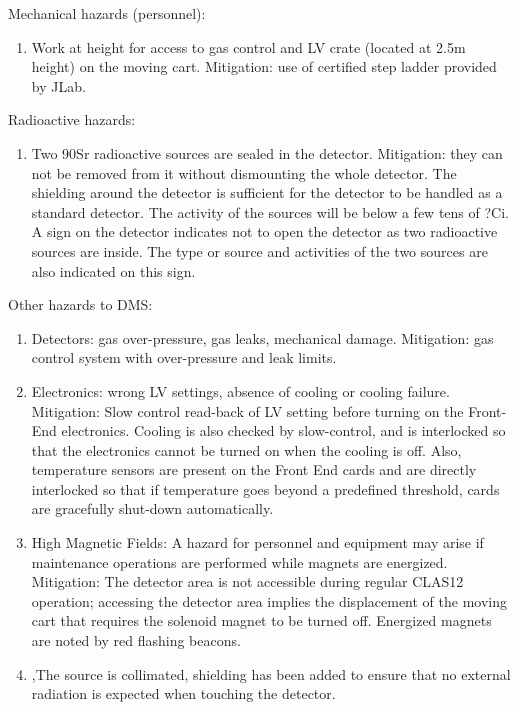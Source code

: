 Mechanical hazards (personnel):
\begin{enumerate}
\item	Work at height for access to gas control and LV crate (located at 2.5m height) on the moving cart. Mitigation: use of certified step ladder provided by JLab.
\end{enumerate}


Radioactive hazards:
\begin{enumerate}
\item Two 90Sr radioactive sources are sealed in the detector. Mitigation: they can not be removed from it without dismounting the whole detector. The shielding around the detector is sufficient for the detector to be handled as a standard detector. The activity of the sources will be below a few tens of ?Ci. A sign on the detector indicates not to open the detector as two radioactive sources are inside. The type or source and activities of the two sources are also indicated on this sign.
\end{enumerate}


Other hazards to DMS:
\begin{enumerate}
\item Detectors: gas over-pressure, gas leaks, mechanical damage. Mitigation: gas control system with over-pressure and leak limits. 
\item Electronics: wrong LV settings, absence of cooling or cooling failure. Mitigation: Slow control read-back of LV setting before turning on the Front-End electronics. Cooling is also checked by slow-control, and is interlocked so that the electronics cannot be turned on when the cooling is off. Also, temperature sensors are present on the Front End cards and are directly interlocked so that if temperature goes beyond a predefined threshold, cards are gracefully shut-down automatically.
\item High Magnetic Fields: A hazard for personnel and equipment may arise if maintenance operations are performed while magnets are energized. Mitigation: The detector area is not accessible during regular CLAS12 operation; accessing the detector area implies the displacement of the moving cart that requires the solenoid magnet to be turned off. Energized magnets are noted by red flashing beacons.
\item,The source is collimated, shielding has been added to ensure that no external radiation is expected when touching the detector.
\end{enumerate}



